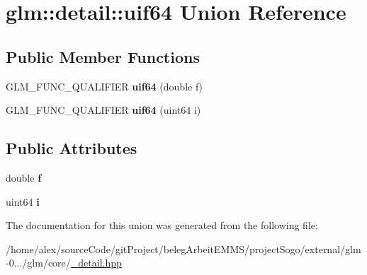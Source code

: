 \hypertarget{unionglm_1_1detail_1_1uif64}{\section{glm\-:\-:detail\-:\-:uif64 Union Reference}
\label{unionglm_1_1detail_1_1uif64}
}
\subsection*{Public Member Functions}
\begin{DoxyCompactItemize}
\item 
\hypertarget{unionglm_1_1detail_1_1uif64_a811b699ddc7ad7d8fd2a5d7124ec2ca2}{G\-L\-M\-\_\-\-F\-U\-N\-C\-\_\-\-Q\-U\-A\-L\-I\-F\-I\-E\-R {\bfseries uif64} (double f)}\label{unionglm_1_1detail_1_1uif64_a811b699ddc7ad7d8fd2a5d7124ec2ca2}

\item 
\hypertarget{unionglm_1_1detail_1_1uif64_ac81669b0cdc1ee96b079ee04eef05a36}{G\-L\-M\-\_\-\-F\-U\-N\-C\-\_\-\-Q\-U\-A\-L\-I\-F\-I\-E\-R {\bfseries uif64} (uint64 i)}\label{unionglm_1_1detail_1_1uif64_ac81669b0cdc1ee96b079ee04eef05a36}

\end{DoxyCompactItemize}
\subsection*{Public Attributes}
\begin{DoxyCompactItemize}
\item 
\hypertarget{unionglm_1_1detail_1_1uif64_aab66f17623b23da00e1a3dc0c0b8b85c}{double {\bfseries f}}\label{unionglm_1_1detail_1_1uif64_aab66f17623b23da00e1a3dc0c0b8b85c}

\item 
\hypertarget{unionglm_1_1detail_1_1uif64_a198f5a44e3d46830cb49381bacbb28a5}{uint64 {\bfseries i}}\label{unionglm_1_1detail_1_1uif64_a198f5a44e3d46830cb49381bacbb28a5}

\end{DoxyCompactItemize}


The documentation for this union was generated from the following file\-:\begin{DoxyCompactItemize}
\item 
/home/alex/source\-Code/git\-Project/beleg\-Arbeit\-E\-M\-M\-S/project\-Sogo/external/glm-\/0.../glm/core/\hyperlink{__detail_8hpp}{\-\_\-detail.\-hpp}\end{DoxyCompactItemize}
